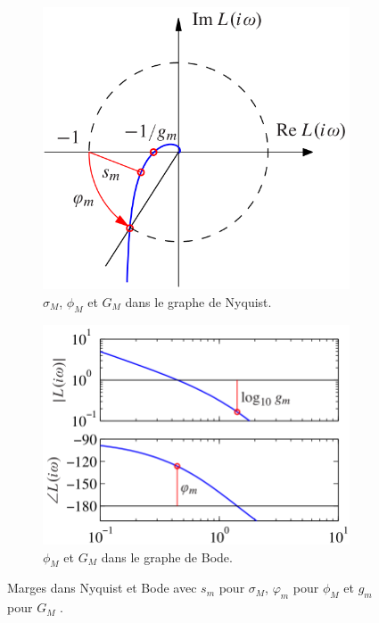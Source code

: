 \begin{figure}
  \begin{subfigure}{0.49\linewidth}
    \centering
    \includegraphics{nyquist-robust.png}
    \caption{$\sigma_M$, $\phi_M$ et $G_M$ dans le graphe de Nyquist.}
    \label{fig:nyquist-robust}
  \end{subfigure}
  \begin{subfigure}{0.49\linewidth}
    \centering
    \includegraphics{bode-robust.png}
    \caption{$\phi_M$ et $G_M$ dans le graphe de Bode.}
    \label{fig:bode-robust}
  \end{subfigure}
  \caption{Marges dans Nyquist et Bode avec $s_m$ pour $\sigma_M$,
  $\varphi_m$ pour $\phi_M$ et $g_m$ pour $G_M$ \cite{astrom2010feedback}.}
  \label{fig:robust-graph}
\end{figure}

